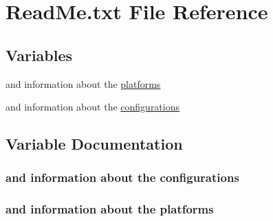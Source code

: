 \hypertarget{_read_me_8txt}{}\section{Read\+Me.\+txt File Reference}
\label{_read_me_8txt}
\subsection*{Variables}
\begin{DoxyCompactItemize}
\item 
and information about the \hyperlink{_read_me_8txt_abe2a01b7211ebe5732626f6469d3cd04}{platforms}
\item 
and information about the \hyperlink{_read_me_8txt_aab1e9a0b414d106b6d4a67a9a9bbd024}{configurations}
\end{DoxyCompactItemize}


\subsection{Variable Documentation}
\subsubsection[{\texorpdfstring{configurations}{configurations}}]{\setlength{\rightskip}{0pt plus 5cm}and information about the configurations}\hypertarget{_read_me_8txt_aab1e9a0b414d106b6d4a67a9a9bbd024}{}\label{_read_me_8txt_aab1e9a0b414d106b6d4a67a9a9bbd024}
\subsubsection[{\texorpdfstring{platforms}{platforms}}]{\setlength{\rightskip}{0pt plus 5cm}and information about the platforms}\hypertarget{_read_me_8txt_abe2a01b7211ebe5732626f6469d3cd04}{}\label{_read_me_8txt_abe2a01b7211ebe5732626f6469d3cd04}
